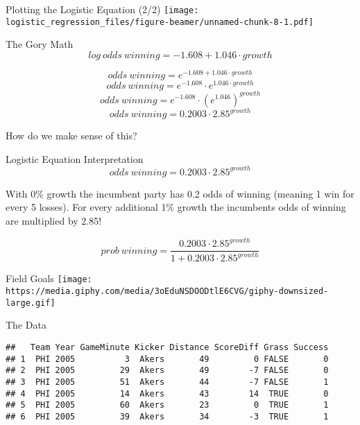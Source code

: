 \documentclass[
  ignorenonframetext,
]{beamer}
\begin{document}
\begin{frame}{Plotting the Logistic Equation (2/2)}
\protect\hypertarget{plotting-the-logistic-equation-22}{}
\texttt{[image: logistic\_regression\_files/figure-beamer/unnamed-chunk-8-1.pdf]}
\end{frame}

\begin{frame}{The Gory Math}
\protect\hypertarget{the-gory-math}{}
\[log\ odds\ winning = -1.608 + 1.046 \cdot growth\]

\[odds\ winning = e^{-1.608 + 1.046 \cdot growth}\]
\[odds\ winning = e^{-1.608} \cdot e^{1.046 \cdot growth}\]
\[odds\ winning = e^{-1.608} \cdot (e^{1.046})^{growth}\]
\[odds\ winning = 0.2003 \cdot 2.85^{growth}\]

How do we make sense of this?
\end{frame}

\begin{frame}{Logistic Equation Interpretation}
\protect\hypertarget{logistic-equation-interpretation}{}
\[odds\ winning = 0.2003 \cdot 2.85^{growth}\]

With 0\% growth the incumbent party has 0.2 odds of winning (meaning 1
win for every 5 losses). For every additional 1\% growth the incumbents
odds of winning are multiplied by 2.85!

\[ prob\ winning = \frac{0.2003 \cdot 2.85^{growth}}{
1 + 0.2003 \cdot 2.85^{growth}
}\]
\end{frame}

\begin{frame}{Field Goals}
\protect\hypertarget{field-goals}{}
\texttt{[image: https://media.giphy.com/media/3oEduNSDOODtlE6CVG/giphy-downsized-large.gif]}
\end{frame}

\begin{frame}[fragile]{The Data}
\protect\hypertarget{the-data}{}
\begin{verbatim}
##   Team Year GameMinute Kicker Distance ScoreDiff Grass Success
## 1  PHI 2005          3  Akers       49         0 FALSE       0
## 2  PHI 2005         29  Akers       49        -7 FALSE       0
## 3  PHI 2005         51  Akers       44        -7 FALSE       1
## 4  PHI 2005         14  Akers       43        14  TRUE       0
## 5  PHI 2005         60  Akers       23         0  TRUE       1
## 6  PHI 2005         39  Akers       34        -3  TRUE       1
\end{verbatim}
\end{frame}
\end{document}
